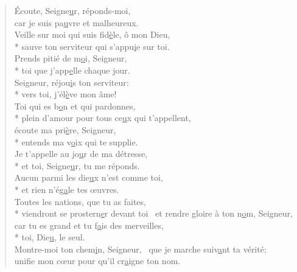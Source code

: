 
\begin{verse}
Écoute, Seigne\underline{u}r, réponds-moi, \\
car je suis pa\underline{u}vre et malheureux. \\
Veille sur moi qui suis fid\underline{è}le, ô mon Dieu, \\*
sauve ton serviteur qui s’appu\underline{i}e sur toi. \\

Prends pitié de m\underline{o}i, Seigneur, \\*
toi que j’app\underline{e}lle chaque jour. \\
Seigneur, réjou\underline{i}s ton serviteur: \\*
vers toi, j’él\underline{è}ve mon âme! \\

Toi qui es b\underline{o}n et qui pardonnes, \\*
plein d’amour pour tous ce\underline{u}x qui t’appellent, \\
écoute ma pri\underline{è}re, Seigneur, \\*
entends ma v\underline{o}ix qui te supplie. \\

Je t’appelle au jo\underline{u}r de ma détresse, \\*
et toi, Seigne\underline{u}r, tu me réponds. \\
Aucun parmi les die\underline{u}x n’est comme toi, \\*
et rien n’ég\underline{a}le tes œuvres. \\

Toutes les nations, que tu as faites, \\*
viendront se prostern\underline{e}r devant toi~\psalmstar
et rendre gloire à ton n\underline{o}m, Seigneur, \\
car tu es grand et tu f\underline{a}is des merveilles, \\*
toi, Die\underline{u}, le seul. \\

Montre-moi ton chem\underline{i}n, Seigneur,~\psalmdagger
que je marche suiv\underline{a}nt ta vérité; \\
unifie mon cœur pour qu’il cr\underline{a}igne ton nom. \\


\end{verse}
